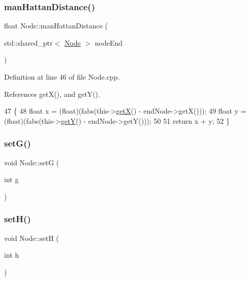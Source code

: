 \subsubsection{\texorpdfstring{man\+Hattan\+Distance()}{manHattanDistance()}}
{\footnotesize\ttfamily float Node\+::man\+Hattan\+Distance (\begin{DoxyParamCaption}\item[{std\+::shared\+\_\+ptr$<$ \hyperlink{class_node}{Node} $>$}]{node\+End }\end{DoxyParamCaption})}



Definition at line 46 of file Node.\+cpp.



References get\+X(), and get\+Y().


\begin{DoxyCode}
47 \{
48     \textcolor{keywordtype}{float} x = (float)(fabs(this->\hyperlink{class_node_a6c026e5d8c28591c6e2bd08c68619fd1}{getX}() - endNode->getX()));
49     \textcolor{keywordtype}{float} y = (float)(fabs(this->\hyperlink{class_node_abab48a3f494994d4f456897f3372d3ae}{getY}() - endNode->getY()));
50 
51     \textcolor{keywordflow}{return} x + y;
52 \}
\end{DoxyCode}
\mbox{\label{class_node_acc878bf405f93ff15be94426b0f768f4}} 
\subsubsection{\texorpdfstring{set\+G()}{setG()}}
{\footnotesize\ttfamily void Node\+::setG (\begin{DoxyParamCaption}\item[{int}]{g }\end{DoxyParamCaption})}

\mbox{\label{class_node_a6076b0a2e7543341bd7b6e60c7635157}} 
\subsubsection{\texorpdfstring{set\+H()}{setH()}}
{\footnotesize\ttfamily void Node\+::setH (\begin{DoxyParamCaption}\item[{int}]{h }\end{DoxyParamCaption})}


